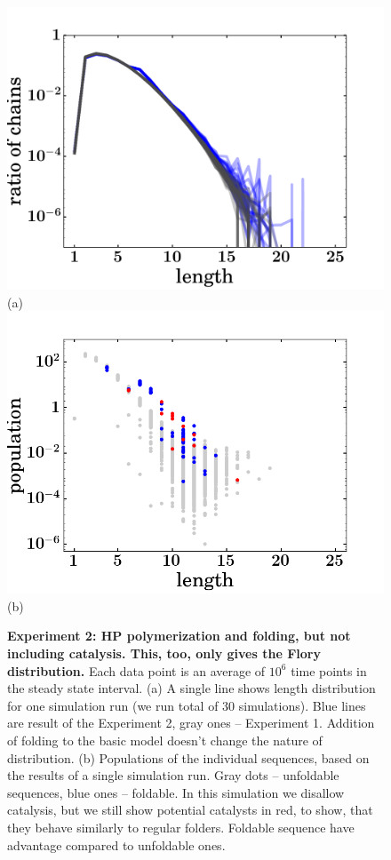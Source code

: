 \documentclass[journal=jacsat,manuscript=article,layout=twocolumn]{achemso}
\begin{document}
\begin{figure}[hbt!]
  \centering
  \includegraphics[width=0.9\columnwidth]{pictures/distr-folded-many.pdf} (a)
   \includegraphics[width=0.9\columnwidth]{pictures/scatter209.png}(b)
  \caption{\footnotesize{\textbf{Experiment 2: HP polymerization and folding, but not 
including catalysis.  This, too, only gives the Flory distribution.}  Each data point is an 
average of $10^6$ time points in the steady state interval. (a) 
A single line shows length distribution for one simulation run (we run total of 30 simulations). 
Blue lines are result of the Experiment 2, gray ones -- Experiment 1. Addition of folding to the 
basic model doesn't change the nature of distribution. (b) Populations of the individual 
sequences, 
based on the results of a single simulation run. Gray dots -- unfoldable sequences, blue ones -- 
foldable. In this simulation we disallow catalysis, but we still show potential catalysts in red, 
to show, that they behave similarly to regular folders. Foldable sequence have advantage compared 
to unfoldable ones.}}
  \label{fig:sim.flory-fold}
\end{figure}
\end{document}
